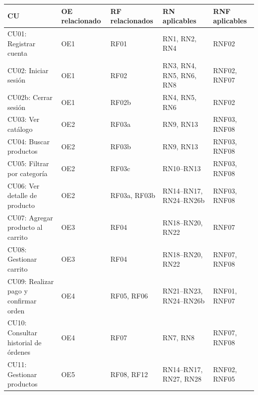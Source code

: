 \documentclass[12pt,a4paper]{article}
\begin{document}
\renewcommand{\arraystretch}{1.0}
\begin{tabularx}{\linewidth}{|p{2.5cm}|X|X|X|X|}
    \hline
    \textbf{CU}                              & \textbf{OE relacionado} & \textbf{RF relacionados} & \textbf{RN aplicables}  & \textbf{RNF aplicables} \\ \hline
    CU01: Registrar cuenta                   & OE1                     & RF01                     & RN1, RN2, RN4           & RNF02                   \\ \hline
    CU02: Iniciar sesión                     & OE1                     & RF02                     & RN3, RN4, RN5, RN6, RN8 & RNF02, RNF07            \\ \hline
    CU02b: Cerrar sesión                     & OE1                     & RF02b                    & RN4, RN5, RN6           & RNF02 
\\ \hline
    CU03: Ver catálogo                       & OE2                     & RF03a                    & RN9, RN13               & RNF03, RNF08            \\ \hline
    CU04: Buscar productos                   & OE2                     & RF03b                    & RN9, RN13               & RNF03, RNF08            \\ \hline
    CU05: Filtrar por categoría              & OE2                     & RF03c                    & RN10--RN13              & RNF03, RNF08            \\ \hline
    CU06: Ver detalle de producto            & OE2                     & RF03a, RF03b             & RN14--RN17, RN24--RN26b & RNF03, RNF08            \\ \hline
    CU07: Agregar producto al carrito        & OE3                     & RF04                     & RN18--RN20, RN22        & RNF07                   \\ \hline
    CU08: Gestionar carrito                  & OE3                     & RF04                     & RN18--RN20, RN22        & RNF07, RNF08            \\ \hline
    CU09: Realizar pago y confirmar orden    & OE4                     & RF05, RF06               & RN21--RN23, RN24--RN26b & RNF01, RNF07            \\ \hline
    CU10: Consultar historial de órdenes     & OE4                     & RF07                     & RN7, RN8                & RNF07, RNF08            \\ \hline
    CU11: Gestionar productos                & OE5                     & RF08, RF12               & RN14--RN17, RN27, RN28  & RNF02, RNF05            \\ \hline

\end{tabularx}
\end{document}
